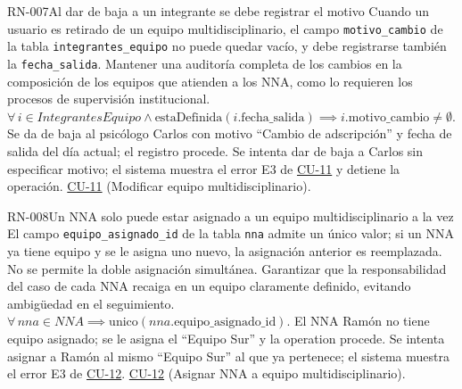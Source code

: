 \begin{BussinesRule}[%
	\brClassification{\btEnabler}{\bcIntegrity}{\blStrict}%
	]{RN-007}{Al dar de baja a un integrante se debe registrar el motivo}
	\BRitem[Descripción:] Cuando un usuario es retirado de un equipo multidisciplinario, el campo \texttt{motivo\_cambio} de la tabla \texttt{integrantes\_equipo} no puede quedar vacío, y debe registrarse también la \texttt{fecha\_salida}.
	\BRitem[Motivación:] Mantener una auditoría completa de los cambios en la composición de los equipos que atienden a los NNA, como lo requieren los procesos de supervisión institucional.
	\BRitem[Sentencia:] $\forall \, i \in IntegrantesEquipo \land \text{estaDefinida}(i.\text{fecha\_salida}) \implies i.\text{motivo\_cambio} \neq \emptyset$.
	 Se da de baja al psicólogo Carlos con motivo ``Cambio de adscripción'' y fecha de salida del día actual; el registro procede.
	 Se intenta dar de baja a Carlos sin especificar motivo; el sistema muestra el error E3 de \hyperlink{CU-11}{CU-11} y detiene la operación.
	 \hyperlink{CU-11}{CU-11} (Modificar equipo multidisciplinario).
\end{BussinesRule}

\begin{BussinesRule}[%
	\brClassification{\btEnabler}{\bcIntegrity}{\blStrict}%
	]{RN-008}{Un NNA solo puede estar asignado a un equipo multidisciplinario a la vez}
	\BRitem[Descripción:] El campo \texttt{equipo\_asignado\_id} de la tabla \texttt{nna} admite un único valor; si un NNA ya tiene equipo y se le asigna uno nuevo, la asignación anterior es reemplazada. No se permite la doble asignación simultánea.
	\BRitem[Motivación:] Garantizar que la responsabilidad del caso de cada NNA recaiga en un equipo claramente definido, evitando ambigüedad en el seguimiento.
	\BRitem[Sentencia:] $\forall \, nna \in NNA \implies \text{unico}(nna.\text{equipo\_asignado\_id})$.
	 El NNA Ramón no tiene equipo asignado; se le asigna el ``Equipo Sur'' y la operation procede.
	 Se intenta asignar a Ramón al mismo ``Equipo Sur'' al que ya pertenece; el sistema muestra el error E3 de \hyperlink{CU-12}{CU-12}.
	 \hyperlink{CU-12}{CU-12} (Asignar NNA a equipo multidisciplinario).
\end{BussinesRule}



